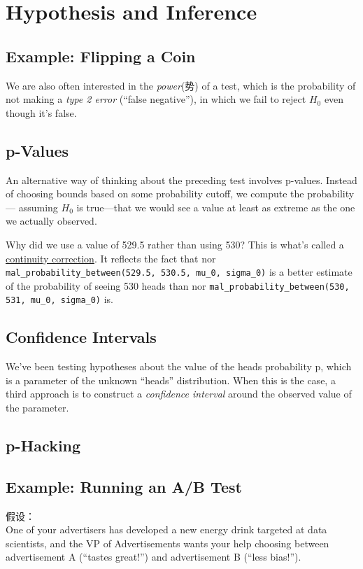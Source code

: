 \chapter{Hypothesis and Inference}
\section{Example: Flipping a Coin}
We are also often interested in the \emph{power}(势) of a test, which is the probability of not
making a \emph{type 2 error} (“false negative”), in which we fail to reject $H_0$ even though it's
false.
\section{p-Values}
An alternative way of thinking about the preceding test involves p-values. Instead of
choosing bounds based on some probability cutoff, we compute the probability—
assuming $H_0$ is true—that we would see a value at least as extreme as the one we
actually observed.

\begin{tcolorbox}
    Why did we use a value of 529.5 rather than using 530? This is
    what's called a \href{https://en.wikipedia.org/wiki/Continuity_correction}{continuity correction}. It reflects the fact that nor
    \verb|mal_probability_between(529.5, 530.5, mu_0, sigma_0)| is a
    better estimate of the probability of seeing 530 heads than nor
    \verb|mal_probability_between(530, 531, mu_0, sigma_0)| is.
\end{tcolorbox}
\section{Confidence Intervals}
We've been testing hypotheses about the value of the heads probability p, which is a
parameter of the unknown “heads” distribution. When this is the case, a third
approach is to construct a \emph{confidence interval} around the observed value of the
parameter.

\section{p-Hacking}
\section{Example: Running an A/B Test}
假设：\\
One of
your advertisers has developed a new energy drink targeted at data scientists, and the
VP of Advertisements wants your help choosing between advertisement A (“tastes
great!”) and advertisement B (“less bias!”).


